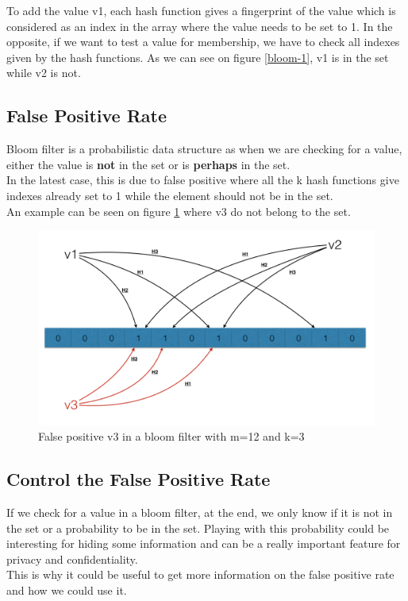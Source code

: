 \documentclass{eplmastersthesis}
\begin{document}
To add the value v1, each hash function gives a fingerprint of the value which is considered as an index in the array where the value needs to be set to 1. In the opposite, if we want to test a value for membership, we have to check all indexes given by the hash functions. As we can see on figure \ref{bloom-1}, v1 is in the set while v2 is not.

\subsection{False Positive Rate}

Bloom filter is a probabilistic data structure as when we are checking for a value, either the value is \textbf{not} in the set or is \textbf{perhaps} in the set. \\
In the latest case, this is due to false positive where all the k hash functions give indexes already set to 1 while the element should not be in the set.\\
An example can be seen on figure \ref{bloom-2} where v3 do not belong to the set.

\begin{figure}[h!]
	\begin{center}
		\includegraphics[scale=0.3]{res/bloom-2}
		\caption{False positive v3 in a bloom filter with m=12 and k=3}
		\label{bloom-2}
	\end{center}
\end{figure}

\subsection{Control the False Positive Rate}
If we check for a value in a bloom filter, at the end, we only know if it is not in the set or a probability to be in the set. Playing with this probability could be interesting for hiding some information and can be a really important feature for privacy and confidentiality.\\
This is why it could be useful to get more information on the false positive rate and how we could use it.\\
\end{document}
